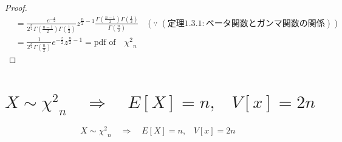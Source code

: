 \begin{proof}
\begin{align*}
                &= \frac{e^{-\frac{z}{2}}}{2^{\frac{n}{2}}\Gamma\left(\frac{n-1}{2}\right)\Gamma\left(\frac{1}{2}\right)}z^{\frac{n}{2}-1}\frac{\Gamma\left(\frac{n-1}{2}\right)\Gamma\left(\frac{1}{2}\right)}{\Gamma\left(\frac{n}{2}\right)} \hspace{10pt} (\because \; (定理1.3.1 : ベータ関数とガンマ関数の関係))\\
                &= \frac{1}{2^{\frac{n}{2}}\Gamma\left(\frac{n}{2}\right)}e^{-\frac{z}{2}}z^{\frac{n}{2}-1} = \text{pdf of} \quad {\chi^2}_n
            \end{align*}
        \end{proof}
    \section{\texorpdfstring{$X \sim {\chi^2}_n \quad \Rightarrow \quad E[X] = n,\;\;\;V[x] = 2n$}{X～χ\string^2\_n ⇒ E(X) = n, V(X) = 2n}}
        \begin{shadebox}
            \[X \sim {\chi^2}_n \quad \Rightarrow \quad E[X] = n,\;\;\;V[x] = 2n\]
        \end{shadebox}
